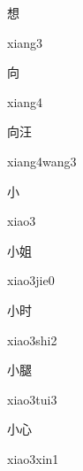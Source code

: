 \begin{verbete}[xiang3]{想}
\begin{pronuncia}{xiang3}
\end{pronuncia}
\end{verbete}

\begin{verbete}[xiang4]{向}
\begin{pronuncia}{xiang4}
\end{pronuncia}
\end{verbete}

\begin{verbete}{向汪}
\begin{pronuncia}{xiang4wang3}
\end{pronuncia}
\end{verbete}

\begin{verbete}[xiao3]{小}
\begin{pronuncia}{xiao3}
\end{pronuncia}
\end{verbete}

\begin{verbete}{小姐}
\begin{pronuncia}{xiao3jie0}
\end{pronuncia}
\end{verbete}

\begin{verbete}{小时}
\begin{pronuncia}{xiao3shi2}
\end{pronuncia}
\end{verbete}

\begin{verbete}{小腿}
\begin{pronuncia}{xiao3tui3}
\end{pronuncia}
\end{verbete}

\begin{verbete}{小心}
\begin{pronuncia}{xiao3xin1}
\end{pronuncia}
\end{verbete}

